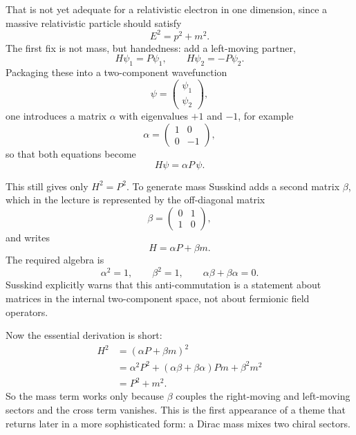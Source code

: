 That is not yet adequate for a relativistic electron in one dimension, since a massive relativistic particle should satisfy
\begin{equation}
E^2=p^2+m^2.
\end{equation}
The first fix is not mass, but handedness: add a left-moving partner,
\begin{equation}
H\psi_1=P\psi_1,
\qquad
H\psi_2=-P\psi_2.
\end{equation}
Packaging these into a two-component wavefunction
\begin{equation}
\psi=
\begin{pmatrix}
\psi_1\\
\psi_2
\end{pmatrix},
\end{equation}
one introduces a matrix \(\alpha\) with eigenvalues \(+1\) and \(-1\), for example
\begin{equation}
\alpha=
\begin{pmatrix}
1&0\\
0&-1
\end{pmatrix},
\end{equation}
so that both equations become
\begin{equation}
H\psi=\alpha P\,\psi.
\end{equation}

This still gives only \(H^2=P^2\). To generate mass Susskind adds a second matrix \(\beta\), which in the lecture is represented by the off-diagonal matrix
\begin{equation}
\beta=
\begin{pmatrix}
0&1\\
1&0
\end{pmatrix},
\end{equation}
and writes
\begin{equation}
H=\alpha P+\beta m.
\end{equation}
The required algebra is
\begin{equation}
\alpha^2=1,
\qquad
\beta^2=1,
\qquad
\alpha\beta+\beta\alpha=0.
\end{equation}
Susskind explicitly warns that this anti-commutation is a statement about matrices in the internal two-component space, not about fermionic field operators.

Now the essential derivation is short:
\begin{align}
H^2
&=(\alpha P+\beta m)^2 \\
&=\alpha^2P^2+(\alpha\beta+\beta\alpha)Pm+\beta^2m^2 \\
&=P^2+m^2.
\end{align}
So the mass term works only because \(\beta\) couples the right-moving and left-moving sectors and the cross term vanishes. This is the first appearance of a theme that returns later in a more sophisticated form: a Dirac mass mixes two chiral sectors.

